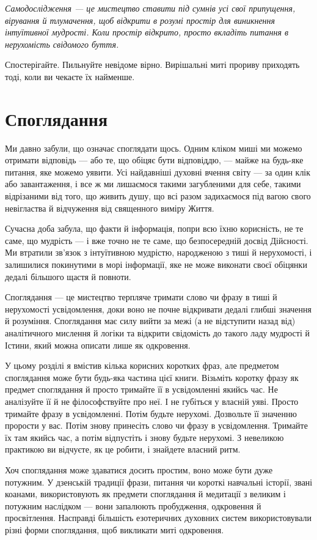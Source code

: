 \emph{Самодослідження — це мистецтво ставити під сумнів усі свої припущення, вірування й тлумачення, щоб відкрити в розумі простір для виникнення інтуїтивної мудрості. Коли простір відкрито, просто вкладіть питання в нерухомість свідомого буття.}

Спостерігайте. Пильнуйте невідоме вірно. Вирішальні миті прориву приходять тоді, коли ви чекаєте їх найменше.

\section*{Споглядання}

Ми давно забули, що означає споглядати щось. Одним кліком миші ми можемо отримати відповідь — або те, що обіцяє бути відповіддю, — майже на будь-яке питання, яке можемо уявити. Усі найдавніші духовні вчення світу — за один клік або завантаження, і все ж ми лишаємося такими загубленими для себе, такими відрізаними від того, що живить душу, що всі разом задихаємося під вагою свого невігластва й відчуження від священного виміру Життя.

Сучасна доба забула, що факти й інформація, попри всю їхню корисність, не те саме, що мудрість — і вже точно не те саме, що безпосередній досвід Дійсності. Ми втратили зв'язок з інтуїтивною мудрістю, народженою з тиші й нерухомості, і залишилися покинутими в морі інформації, яке не може виконати своєї обіцянки дедалі більшого щастя й повноти.

Споглядання — це мистецтво терпляче тримати слово чи фразу в тиші й нерухомості усвідомлення, доки воно не почне відкривати дедалі глибші значення й розуміння. Споглядання має силу вийти за межі (а не відступити назад від) аналітичного мислення й логіки та відкрити свідомість до такого ладу мудрості й Істини, який можна описати лише як одкровення.

У цьому розділі я вмістив кілька корисних коротких фраз, але предметом споглядання може бути будь-яка частина цієї книги. Візьміть коротку фразу як предмет споглядання й просто тримайте її в усвідомленні якийсь час. Не аналізуйте її й не філософствуйте про неї. І не губіться у власній уяві. Просто тримайте фразу в усвідомленні. Потім будьте нерухомі. Дозвольте її значенню прорости у вас. Потім знову принесіть слово чи фразу в усвідомлення. Тримайте їх там якийсь час, а потім відпустіть і знову будьте нерухомі. З невеликою практикою ви відчуєте, як це робити, і знайдете власний ритм.

Хоч споглядання може здаватися досить простим, воно може бути дуже потужним. У дзенській традиції фрази, питання чи короткі навчальні історії, звані коанами, використовують як предмети споглядання й медитації з великим і потужним наслідком — вони запалюють пробудження, одкровення й просвітлення. Насправді більшість езотеричних духовних систем використовували різні форми споглядання, щоб викликати миті одкровення.

